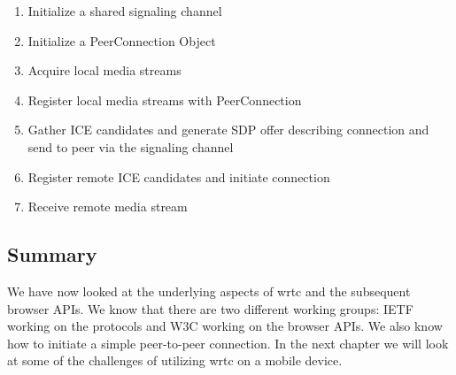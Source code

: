 \begin{enumerate}
\item{Initialize a shared signaling channel}
\item{Initialize a PeerConnection Object}
\item{Acquire local media streams}
\item{Register local media streams with PeerConnection}
\item{Gather ICE candidates and generate SDP offer describing connection and send to peer via the signaling channel}
\item{Register remote ICE candidates and initiate connection}
\item{Receive remote media stream}
\end{enumerate} 


\subsection{Summary}
We have now looked at the underlying aspects of \gls{wrtc} and the subsequent browser APIs. We know that there are two different working groups: IETF working on the protocols and W3C working on the browser APIs. We also know how to initiate a simple peer-to-peer connection. In the next chapter we will look at some of the challenges of utilizing \gls{wrtc} on a mobile device.